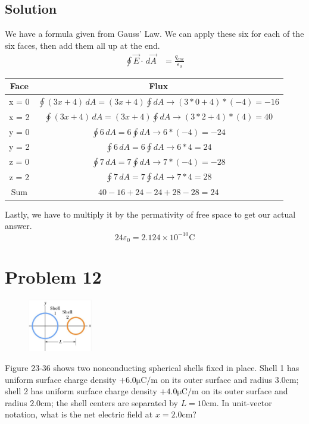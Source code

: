 \documentclass[12pt]{article}
\begin{document}
\subsection{Solution}
We have a formula given from Gauss' Law. We can apply these six for each of the six faces, then add them all up at the end.
\begin{align*}
    \oint \vec{E} \cdot \,d\vec{A}  &=  \frac{q_{enc}}{\varepsilon_0}
\end{align*}

\begin{tabular*}{\textwidth}{c | c}
    Face    &   Flux\\
    \hline
    x = 0   &   $\oint(3x + 4) \,dA = (3x + 4)\oint dA \rightarrow (3*0 + 4)*(-4) = -16$\\
    x = 2   &   $\oint(3x + 4) \,dA = (3x + 4)\oint dA \rightarrow (3*2 + 4)*(4) = 40$\\
    y = 0   &   $\oint 6 \,dA = 6 \oint dA \rightarrow 6*(-4) = -24$\\
    y = 2   &   $\oint 6 \,dA = 6 \oint dA \rightarrow 6*4 = 24$\\
    z = 0   &   $\oint 7 \,dA = 7 \oint dA \rightarrow 7*(-4) = -28$\\
    z = 2   &   $\oint 7 \,dA = 7 \oint dA \rightarrow 7*4 = 28$\\
    Sum     &   $40 - 16 + 24 - 24 + 28 - 28 = 24$
\end{tabular*}

Lastly, we have to multiply it by the permativity of free space to get our actual answer.
\begin{equation*}
    24\varepsilon_0 = \boxed{2.124 \times 10^{-10} \unit{\coulomb}}
\end{equation*}

\pagebreak
\section{Problem 12}
\begin{figure}
    \vspace{-30pt}
    \includegraphics[width=0.25\textwidth]{picture_6.png} 
\end{figure}
Figure 23-36 shows two nonconducting spherical shells fixed in place. Shell 1 has uniform surface
charge density $+6.0 \unit{\micro\coulomb/\meter}$ on its outer surface and radius $3.0 \unit{\centi\meter}$; shell 2 has uniform surface charge density $+4.0 \unit{\micro\coulomb/\meter}$ on its outer surface and radius $2.0 \unit{\centi\meter}$; the shell centers are separated by $L = 10 \unit{\centi\meter}$. In unit-vector notation, what is the net electric field at $x = 2.0 \unit{\centi\meter}$?
\end{document}
